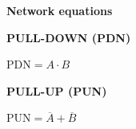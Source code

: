 \documentclass[a4paper,11pt]{article}
\begin{document}
\begin{minipage}[t]{0.26\linewidth}
    \centering
    {\sffamily\small\bfseries\color{NoteMuted}Network equations\par}
    \vspace{10pt}
    {\sffamily\scriptsize\bfseries\color{NoteAccent}PULL-DOWN (PDN)\par}
    \vspace{2pt}
    {$\displaystyle \mathrm{PDN}=A\cdot B$\par}
    \vspace{12pt}
    {\sffamily\scriptsize\bfseries\color{NoteAccent}PULL-UP (PUN)\par}
    \vspace{2pt}
    {$\displaystyle \mathrm{PUN}=\overline{A}+\overline{B}$\par}
\end{minipage}
\par
\end{document}
